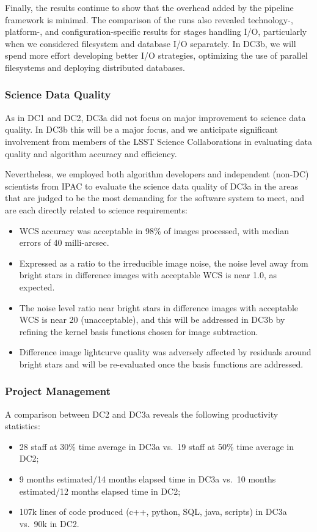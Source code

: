Finally, the results continue to show that the overhead 
added by the  pipeline framework is minimal.
The comparison of the runs also revealed technology-, platform-, and configuration-specific results for stages
handling I/O, particularly when we considered filesystem and database
I/O separately. In DC3b, we will spend more effort developing better I/O
strategies, optimizing the use of parallel filesystems and deploying distributed databases.  

\subsubsection*{Science Data Quality}
As in DC1 and DC2, DC3a did not focus on major improvement to science data quality.  
In DC3b this will be a major focus, and we anticipate significant involvement from
members of the LSST Science Collaborations in evaluating data quality and algorithm accuracy
and efficiency.

Nevertheless, we employed both algorithm developers and independent
 (non-DC) scientists from IPAC
to evaluate the science data quality of DC3a in the areas that are
judged to be the most demanding for the software system to meet, 
and are each directly related to science requirements:
\begin{itemize}
\item WCS accuracy was acceptable in 98\% of images processed, with median errors of 40 milli-arcsec.
\item Expressed as a ratio to the irreducible image noise, the noise level away from bright stars in difference images with acceptable WCS is near 1.0, as expected.
\item The noise level ratio near bright stars in difference images with acceptable WCS is near 20 (unacceptable), and this will be addressed in DC3b by refining the kernel basis functions chosen for image subtraction.
\item Difference image lightcurve quality was adversely affected by residuals around bright stars and will be re-evaluated once the basis functions are addressed.
\end{itemize}

\subsubsection*{Project Management}
A comparison between DC2 and DC3a reveals the following productivity statistics:
\begin{itemize}
\item 28 staff at 30\% time average in DC3a vs.~19 staff at 50\% time average in DC2;
\item 9 months estimated/14 months elapsed time in DC3a vs.~10 months estimated/12 months elapsed time in DC2;
\item 107k lines of code produced (c++, python, SQL, java, scripts) in DC3a vs.~90k in DC2.
\end{itemize}

